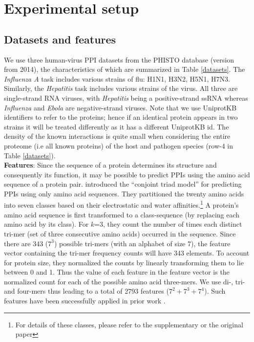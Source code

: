 \documentclass[runningheads,a4paper]{llncs}
\begin{document}
\section{Experimental setup}
\subsection{Datasets and features}
\label{sec:datasets}
We use three human-virus PPI datasets from the PHISTO \citep{phisto} database (version from 2014), the characteristics of which are summarized in Table \ref{datasets}. 
The \textit{Influenza A} task includes various strains of flu: H1N1, H3N2, H5N1, H7N3. 
Similarly, the \textit{Hepatitis} task includes various strains of the virus. 
All three are single-strand RNA viruses, with \textit{Hepatitis} being a positive-strand ssRNA whereas \textit{Influenza} and \textit{Ebola} are negative-strand viruses. Note that we use UniprotKB identifiers to refer to
the proteins; hence if an identical protein appears in two strains it will be treated differently as it has a different
UniprotKB id. The density of the known interactions is quite small when considering the entire proteome (i.e all known proteins) of the host and pathogen species (row-4 in Table \ref{datasets}). \\
\noindent\textbf{Features}: 
Since the sequence of a protein determines its structure and consequently its function, it may be possible to predict PPIs using the amino acid sequence of a protein pair. \cite{shen:2007} introduced the ``conjoint triad model'' for predicting PPIs using only amino acid sequences. They partitioned the twenty amino acids into seven classes based on their electrostatic and water affinities.\footnote{For details of these classes, please refer to the supplementary or the original paper}
A protein's amino acid sequence is first transformed to a class-sequence (by replacing each amino acid by its class).
For $k$=3, they count the number of times each distinct tri-mer (set of three consecutive amino acids) occurred in the sequence.
Since there are 343 ($7^3$) possible tri-mers (with an alphabet of size 7), the feature vector containing the tri-mer frequency counts will have 343 elements.
To account for protein size, they normalized the counts by linearly transforming them to lie between 0 and 1.
Thus the value of each feature in the feature vector is the normalized count for each of the possible amino acid three-mers. We use di-, tri- and four-mers thus leading to a total of 2793 features ($7^2 + 7^3 + 7^4$).
Such features have been successfully applied in prior work \citep{dyer07,me_ismb_2013}.
\end{document}
